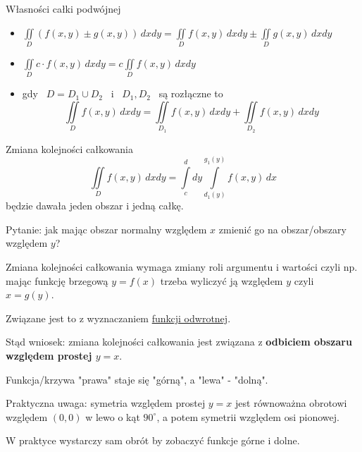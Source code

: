 \begin{tw}{Własności całki podwójnej}
\begin{itemize}
    \item $ \iint\limits_D \left( f(x,y) \pm g(x,y) \right)\, dxdy = \iint\limits_D f(x,y)\, dxdy \pm \iint\limits_D g(x,y)\, dxdy $
    \item $ \iint\limits_D c \cdot f(x,y)\, dxdy = c \iint\limits_D f(x,y)\, dxdy $
    \item gdy \ $ D = D_1 \cup D_2 $ \ i \ $ D_1, D_2 $ \ są rozłączne to
    \[ \iint\limits_D f(x,y)\, dxdy = \iint\limits_{D_1} f(x,y)\, dxdy + \iint\limits_{D_2} f(x,y)\, dxdy \]
\end{itemize}
\end{tw}

\begin{tw}{Zmiana kolejności całkowania}
    \[ \iint\limits_D f(x,y)\, dxdy = \int\limits_{c}^{d} dy \int\limits_{d_1(y)}^{g_1(y)} f(x,y)\, dx \]
    będzie dawała jeden obszar i jedną całkę.
\end{tw}

Pytanie: jak mając obszar normalny względem $x$ zmienić go na obszar/obszary względem $y$?

Zmiana kolejności całkowania wymaga zmiany roli argumentu i wartości czyli np. mając funkcję brzegową $ y = f(x) $ trzeba wyliczyć ją względem $y$
czyli $x = g(y)$.

Związane jest to z wyznaczaniem \underline{funkcji odwrotnej}.

Stąd wniosek: zmiana kolejności całkowania jest związana z \textbf{odbiciem obszaru względem prostej $ y = x $}.

Funkcja/krzywa "prawa" staje się "górną", a "lewa" - "dolną".

Praktyczna uwaga: symetria względem prostej $y = x$ jest równoważna obrotowi względem $(0,0)$ w lewo o kąt $90^{\circ}$, a potem symetrii
względem osi pionowej.

W praktyce wystarczy sam obrót by zobaczyć funkcje górne i dolne.

